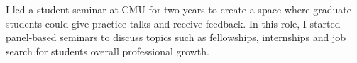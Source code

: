 \documentclass[10pt]{article}
\begin{document}
I led a student seminar at CMU for two years to create a space where graduate students could give practice talks and receive feedback. In this role, I started panel-based seminars to discuss topics such as fellowships, internships and job search for students overall professional growth. 





%

\end{document}
